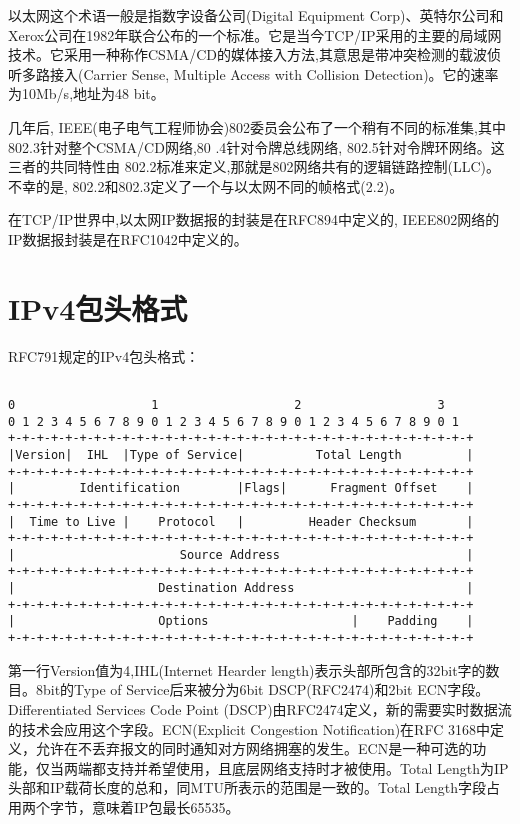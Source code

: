 以太网这个术语一般是指数字设备公司(Digital Equipment Corp)、英特尔公司和Xerox公司在1982年联合公布的一个标准。它是当今TCP/IP采用的主要的局域网技术。它采用一种称作CSMA/CD的媒体接入方法,其意思是带冲突检测的载波侦听多路接入(Carrier Sense, Multiple Access with Collision Detection)。它的速率为10Mb/s,地址为48 bit。

几年后, IEEE(电子电气工程师协会)802委员会公布了一个稍有不同的标准集,其中802.3针对整个CSMA/CD网络,80 .4针对令牌总线网络, 802.5针对令牌环网络。这三者的共同特性由 802.2标准来定义,那就是802网络共有的逻辑链路控制(LLC)。不幸的是, 802.2和802.3定义了一个与以太网不同的帧格式(\cite{tcpipill}2.2)。

在TCP/IP世界中,以太网IP数据报的封装是在RFC894中定义的, IEEE802网络的IP数据报封装是在RFC1042中定义的。

\section{IPv4包头格式}
RFC791规定的IPv4包头格式：
\begin{center}
\begin{lstlisting}

0                   1                   2                   3
0 1 2 3 4 5 6 7 8 9 0 1 2 3 4 5 6 7 8 9 0 1 2 3 4 5 6 7 8 9 0 1
+-+-+-+-+-+-+-+-+-+-+-+-+-+-+-+-+-+-+-+-+-+-+-+-+-+-+-+-+-+-+-+-+
|Version|  IHL  |Type of Service|          Total Length         |
+-+-+-+-+-+-+-+-+-+-+-+-+-+-+-+-+-+-+-+-+-+-+-+-+-+-+-+-+-+-+-+-+
|         Identification        |Flags|      Fragment Offset    |
+-+-+-+-+-+-+-+-+-+-+-+-+-+-+-+-+-+-+-+-+-+-+-+-+-+-+-+-+-+-+-+-+
|  Time to Live |    Protocol   |         Header Checksum       |
+-+-+-+-+-+-+-+-+-+-+-+-+-+-+-+-+-+-+-+-+-+-+-+-+-+-+-+-+-+-+-+-+
|                       Source Address                          |
+-+-+-+-+-+-+-+-+-+-+-+-+-+-+-+-+-+-+-+-+-+-+-+-+-+-+-+-+-+-+-+-+
|                    Destination Address                        |
+-+-+-+-+-+-+-+-+-+-+-+-+-+-+-+-+-+-+-+-+-+-+-+-+-+-+-+-+-+-+-+-+
|                    Options                    |    Padding    |
+-+-+-+-+-+-+-+-+-+-+-+-+-+-+-+-+-+-+-+-+-+-+-+-+-+-+-+-+-+-+-+-+
\end{lstlisting}
\end{center}

第一行Version值为4,IHL(Internet Hearder length)表示头部所包含的32bit字的数目。8bit的Type of Service后来被分为6bit DSCP(RFC2474)和2bit ECN字段。Differentiated Services Code Point (DSCP)由RFC2474定义，新的需要实时数据流的技术会应用这个字段。ECN(Explicit Congestion Notification)在RFC 3168中定义，允许在不丢弃报文的同时通知对方网络拥塞的发生。ECN是一种可选的功能，仅当两端都支持并希望使用，且底层网络支持时才被使用。Total Length为IP头部和IP载荷长度的总和，同MTU所表示的范围是一致的。Total Length字段占用两个字节，意味着IP包最长65535。

